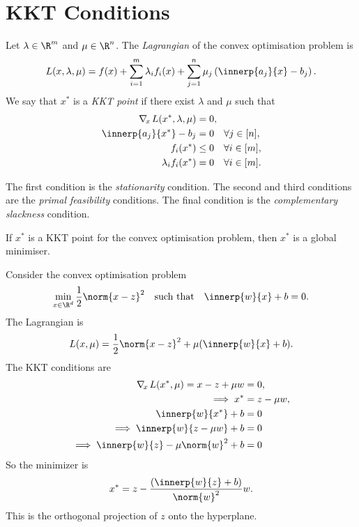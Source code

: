 \section{KKT Conditions} \label{sec:kkt}
\begin{definition*} \label{def:kkt}
    Let $\lambda \in \R^m$ and $\mu \in \R^n$.
    The \emph{Lagrangian} of the convex optimisation problem is \[
        L(x, \lambda, \mu) = f(x) + \sum_{i=1}^{m} \lambda_i f_i(x)
            + \sum_{j=1}^{n} \mu_j \left(\innerp{a_j}{x} - b_j\right).
    \] We say that $x^*$ is a \emph{KKT point} if there exist $\lambda$ and
    $\mu$ such that
    \begin{align*}
        \nabla_{\!x\,} L(x^*, \lambda, \mu) &= 0, \\
        \innerp{a_j}{x^*} - b_j &= 0 \quad \forall j \in [n], \\
        f_i(x^*) &\le 0 \quad \forall i \in [m], \\
        \lambda_i f_i(x^*) &= 0 \quad \forall i \in [m].
    \end{align*}
\end{definition*}
The first condition is the \emph{stationarity} condition.
The second and third conditions are the \emph{primal feasibility}
conditions.
The final condition is the \emph{complementary slackness} condition.
\begin{fact*}
    If $x^*$ is a KKT point for the convex optimisation problem, then
    $x^*$ is a global minimiser.
\end{fact*}
\begin{example}
    Consider the convex optimisation problem \[
        \min_{x \in \R^d} \frac12 \norm{x - z}^2 \quad \text{such that}
            \quad \innerp{w}{x} + b = 0.
    \] The Lagrangian is \[
        L(x, \mu) = \frac12 \norm{x - z}^2 + \mu(\innerp{w}{x} + b).
    \] The KKT conditions are \begin{align*}
        \nabla_{\!x\,} L(x^*, \mu) = x - z + \mu w &= 0, \\
        \implies x^* &= z - \mu w, \\
        \innerp{w}{x^*} + b &= 0 \\
        \implies \innerp{w}{z - \mu w} + b &= 0 \\
        \implies \innerp{w}{z} - \mu \norm{w}^2 + b &= 0
    \end{align*}
    So the minimizer is \[
        x^* = z - \frac{(\innerp{w}{z} + b)}{\norm{w}^2} w.
    \]
    This is the orthogonal projection of $z$ onto the hyperplane.
\end{example}


